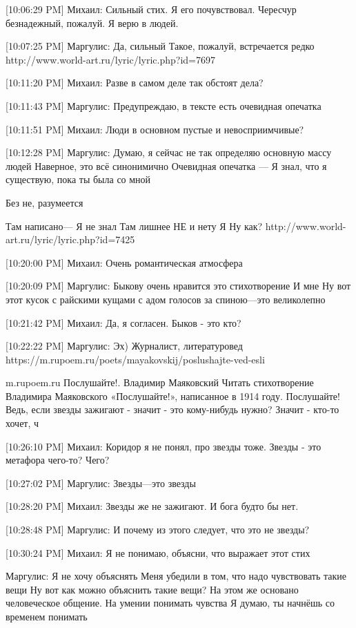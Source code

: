 \documentclass{article}
\begin{document}
[10:06:29 PM] Михаил:
Сильный стих. Я его почувствовал.
 Чересчур безнадежный, пожалуй. Я верю в людей.

[10:07:25 PM] Маргулис:
Да, сильный
 Такое, пожалуй, встречается редко
 http://www.world-art.ru/lyric/lyric.php?id=7697

[10:11:20 PM] Михаил:
Разве в самом деле так обстоят дела?

[10:11:43 PM] Маргулис:
Предупреждаю, в тексте есть очевидная опечатка

[10:11:51 PM] Михаил:
Люди в основном пустые и невосприимчивые?

[10:12:28 PM] Маргулис:
Думаю, я сейчас не так определяю основную массу людей
 Наверное, это всё синонимично
 Очевидная опечатка — Я знал, что я существую, пока ты была со мной 

Без не, разумеется 

Там написано— Я не знал
 Там лишнее НЕ и нету Я
 Ну как?
 http://www.world-art.ru/lyric/lyric.php?id=7425

[10:20:00 PM] Михаил:
Очень романтическая атмосфера

[10:20:09 PM] Маргулис:
Быкову очень нравится это стихотворение
 И мне
 Ну вот этот кусок с райскими кущами с адом голосов за спиною—это великолепно

[10:21:42 PM] Михаил:
Да, я согласен.
 Быков - это кто?

[10:22:22 PM] Маргулис:
Эх)
 Журналист, литературовед
 https://m.rupoem.ru/poets/mayakovskij/poslushajte-ved-esli

m.rupoem.ru
Послушайте!. Владимир Маяковский
Читать стихотворение Владимира Маяковского «Послушайте!», написанное в 1914 году. Послушайте! Ведь, если звезды зажигают - значит - это кому-нибудь нужно? Значит - кто-то хочет, ч

[10:26:10 PM] Михаил:
Коридор я не понял, про звезды тоже.
 Звезды - это метафора чего-то? Чего?

[10:27:02 PM] Маргулис:
Звезды—это звезды

[10:28:20 PM] Михаил:
Звезды же не зажигают. И бога будто бы нет.

[10:28:48 PM] Маргулис:
И почему из этого следует, что это не звезды?

[10:30:24 PM] Михаил:
Я не понимаю, объясни, что выражает этот стих

Маргулис:
Я не хочу объяснять
 Меня убедили в том, что надо чувствовать такие вещи
 Ну вот как можно объяснить такие вещи? На этом же основано человеческое общение. На умении понимать чувства
 Я думаю, ты начнёшь со временем понимать
\end{document}
